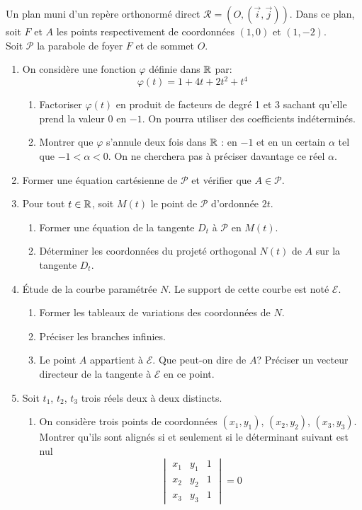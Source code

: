 Un plan muni d'un repère orthonormé direct $\mathcal R = (O,(\overrightarrow i ,\overrightarrow j))$. Dans ce plan, soit $F$ et $A$ les points respectivement de coordonnées $(1,0)$ et $(1,-2)$.\\ Soit $\mathcal{P}$ la parabole de foyer $F$ et de sommet $O$.
\begin{enumerate}
 \item  On considère une fonction $\varphi$ définie dans $\mathbb{R}$ par:
\begin{displaymath}
 \varphi(t) = 1+4t+2t^2+t^4
\end{displaymath}
\begin{enumerate}
 \item Factoriser $\varphi(t)$ en produit de facteurs de degré 1 et 3 sachant qu'elle prend la valeur $0$ en $-1$. On pourra utiliser des coefficients indéterminés.
 \item Montrer que $\varphi$ s'annule deux fois dans $\mathbb{R}$ : en $-1$ et en un certain $\alpha$ tel que $-1<\alpha <0$. On ne cherchera pas à préciser davantage ce réel $\alpha$.
\end{enumerate}

 \item Former une équation cartésienne de $\mathcal{P}$ et vérifier que $A\in \mathcal{P}$.
 \item Pour tout $t\in \mathbb{R}$, soit $M(t)$ le point de $\mathcal{P}$ d'ordonnée $2t$.
\begin{enumerate}
 \item Former une équation de la tangente $D_t$ à $\mathcal{P}$ en $M(t)$.
 \item Déterminer les coordonnées du projeté orthogonal $N(t)$ de $A$ sur la tangente $D_t$.
\end{enumerate}
\item \'Etude de la courbe paramétrée $N$. Le support de cette courbe est noté $\mathcal E$.
\begin{enumerate}
 \item Former les tableaux de variations des coordonnées de $N$.
 \item Préciser les branches infinies.
 \item Le point $A$ appartient à $\mathcal E$. Que peut-on dire de $A$? Préciser un vecteur directeur de la tangente à $\mathcal E$ en ce point.
\end{enumerate}
\item Soit $t_1$, $t_2$, $t_3$ trois réels deux à deux distincts.
\begin{enumerate}
 \item On considère trois points de coordonnées $(x_1,y_1)$, $(x_2,y_2)$, $(x_3,y_3)$. Montrer qu'ils sont alignés si et seulement si le déterminant suivant est nul
\begin{displaymath}
 \begin{vmatrix}
  x_1 & y_1 & 1 \\x_2 & y_2 & 1 \\ x_3 & y_3 & 1  
 \end{vmatrix}
=0
\end{displaymath}


\end{enumerate}
\end{enumerate}
